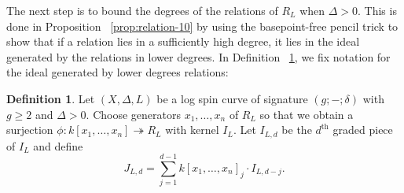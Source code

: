 \documentclass{amsart}
\theoremstyle{plain}
\theoremstyle{definition}
\newtheorem{defn}[thm]{Definition}
\theoremstyle{remark}
\numberwithin{equation}{section}
\DeclareMathOperator{\sym}{Sym}
\newcommand{\halfcan}{L}
\begin{document}
%

The next step is to bound the degrees of the relations of $R_\halfcan$ when $\Delta > 0$. This is done in Proposition ~\ref{prop:relation-10}
by using the basepoint-free pencil trick to show that if a relation lies in a sufficiently high degree, it lies in the ideal generated by the relations in lower degrees.  In Definition ~\ref{defn:lower-ideal}, we fix notation for the ideal generated by lower degrees relations:

\begin{defn}
\label{defn:lower-ideal}
Let $(X, \Delta, L)$ be a log spin curve of signature $(g; -; \delta
)$ with $g \geq 2$ and $\Delta > 0.$ Choose generators $x_1, \ldots
, x_n$ of $R_\halfcan$ so that we obtain a surjection $\phi: k[x_1, \ldots
, x_n] \twoheadrightarrow R_\halfcan$ with kernel $I_\halfcan$. Let $I_{\halfcan, d}$ be
the $d^\text{th}$ graded piece of $I_\halfcan$ and define
\[
	J_{\halfcan,d} = \sum_{j = 1}^{d- 1}k[x_1, \ldots, x_n]_j \cdot I_{\halfcan,d-j}.
\]
\end{defn}
\end{document}
